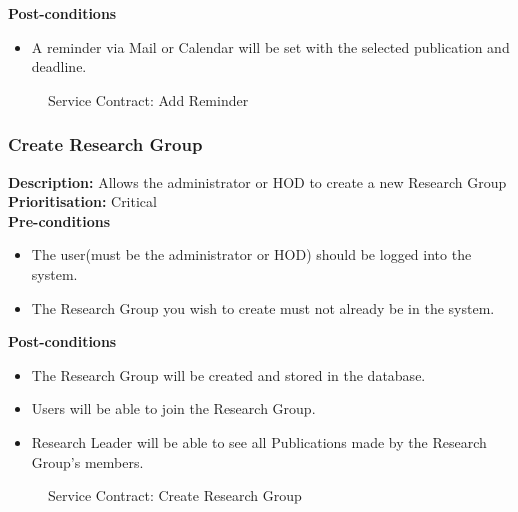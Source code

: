 \documentclass[a4paper]{article}
\begin{document}
            \textbf{Post-conditions}
            \begin{itemize}
            	\item A reminder via Mail or Calendar will be set with the selected publication and deadline.
            \end{itemize}
            
                	\begin{figure}[H]
                		\centering
                		\caption{Service Contract: Add Reminder}
                	\end{figure}
            
            \pagebreak
    \subsubsection{Create Research Group}
    	\textbf{Description:} Allows the administrator or HOD to create a new Research Group\\
    	\textbf{Prioritisation:} Critical\\
    	
    	\textbf{Pre-conditions}
    	 \begin{itemize}
    		\item The user(must be the administrator or HOD) should be logged into the system.
    		\item The Research Group you wish to create must not already be in the system.
    	\end{itemize}
    	
    	\textbf{Post-conditions}
    	 \begin{itemize}
    		\item The Research Group will be created and stored in the database.
    		\item Users will be able to join the Research Group.
    		\item Research Leader will be able to see all Publications made by the Research Group's members.
    	\end{itemize}
    	
    	    	\begin{figure}[H]
    	    		\centering
    	    		\caption{Service Contract: Create Research Group}
    	    	\end{figure}
    	
\end{document}
